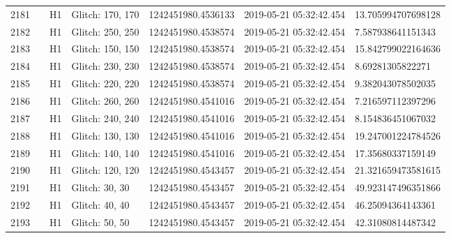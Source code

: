 \begin{longtable}{lllllll}
2181 &                                                    &       H1 &  Glitch: 170, 170 &  1242451980.4536133 &  2019-05-21 05:32:42.454 &  13.705994707698128 \\
2182 &                                                    &       H1 &  Glitch: 250, 250 &  1242451980.4538574 &  2019-05-21 05:32:42.454 &   7.587938641151343 \\
2183 &                                                    &       H1 &  Glitch: 150, 150 &  1242451980.4538574 &  2019-05-21 05:32:42.454 &  15.842799022164636 \\
2184 &                                                    &       H1 &  Glitch: 230, 230 &  1242451980.4538574 &  2019-05-21 05:32:42.454 &    8.69281305822271 \\
2185 &                                                    &       H1 &  Glitch: 220, 220 &  1242451980.4538574 &  2019-05-21 05:32:42.454 &   9.382043078502035 \\
2186 &                                                    &       H1 &  Glitch: 260, 260 &  1242451980.4541016 &  2019-05-21 05:32:42.454 &   7.216597112397296 \\
2187 &                                                    &       H1 &  Glitch: 240, 240 &  1242451980.4541016 &  2019-05-21 05:32:42.454 &   8.154836451067032 \\
2188 &                                                    &       H1 &  Glitch: 130, 130 &  1242451980.4541016 &  2019-05-21 05:32:42.454 &  19.247001224784526 \\
2189 &                                                    &       H1 &  Glitch: 140, 140 &  1242451980.4541016 &  2019-05-21 05:32:42.454 &   17.35680337159149 \\
2190 &                                                    &       H1 &  Glitch: 120, 120 &  1242451980.4543457 &  2019-05-21 05:32:42.454 &  21.321659473581615 \\
2191 &                                                    &       H1 &    Glitch: 30, 30 &  1242451980.4543457 &  2019-05-21 05:32:42.454 &  49.923147496351866 \\
2192 &                                                    &       H1 &    Glitch: 40, 40 &  1242451980.4543457 &  2019-05-21 05:32:42.454 &   46.25094364143361 \\
2193 &                                                    &       H1 &    Glitch: 50, 50 &  1242451980.4543457 &  2019-05-21 05:32:42.454 &   42.31080814487342 \\

\end{longtable}
